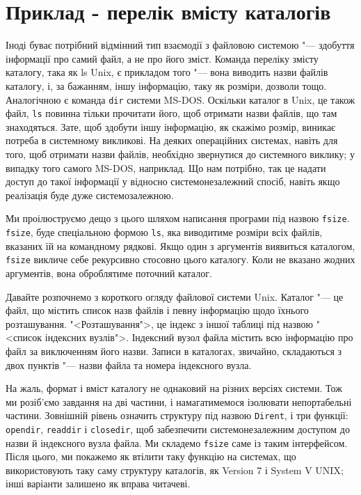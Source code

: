 \documentclass[a4paper,12pt]{book}
\begin{document}
\section{Приклад - перелік вмісту каталогів}

\label{f0:ch8.6}
  Іноді буває потрібний відмінний тип взаємодії з файловою системою "--- здобуття
  інформації про самий файл, а не про його зміст. Команда переліку змісту каталогу, така
  як ls Unix, є прикладом того "--- вона виводить назви файлів каталогу, і, за
  бажанням, іншу інформацію, таку як розміри, дозволи тощо. Аналогічною є команда
  \texttt{dir} системи MS-DOS. Оскільки каталог в Unix, це також файл, \texttt{ls}
  повинна тільки прочитати його, щоб отримати назви файлів, що там знаходяться. Зате, щоб
  здобути іншу інформацію, як скажімо розмір, виникає потреба в системному викликові. На
  деяких операційних системах, навіть для того, щоб отримати назви файлів, необхідно
  звернутися до системного виклику; у випадку того самого MS-DOS, наприклад. Що нам
  потрібно, так це надати доступ до такої інформації у відносно системонезалежний спосіб,
  навіть якщо реалізація буде дуже системозалежною.

  Ми проілюструємо дещо з цього шляхом написання програми під назвою \texttt{fsize}.
  \texttt{fsize}, буде спеціальною формою \texttt{ls}, яка виводитиме розміри всіх файлів,
  вказаних їй на командному рядкові. Якщо один з аргументів виявиться каталогом,
  \texttt{fsize} викличе себе рекурсивно стосовно цього каталогу. Коли не вказано жодних
  аргументів, вона оброблятиме поточний каталог.

  Давайте розпочнемо з короткого огляду файлової системи Unix. Каталог "--- це файл,
  що містить список назв файлів і певну інформацію щодо їхнього розташування.
  "<Розташування">, це індекс з іншої таблиці під назвою "<список індексних
  вузлів">. Індексний вузол файла містить всю інформацію про файл за виключенням його
  назви. Записи в каталогах, звичайно, складаються з двох пунктів "--- назви файла та
  номера індексного вузла.

  На жаль, формат і вміст каталогу не однаковий на різних версіях системи. Тож ми
  розіб'ємо завдання на дві частини, і намагатимемося ізолювати непортабельні частини.
  Зовнішній рівень означить структуру під назвою \texttt{Dirent}, і три функції:
  \texttt{opendir}, \texttt{readdir} і \texttt{closedir}, щоб забезпечити
  системонезалежним доступом до назви й індексного вузла файла. Ми складемо \texttt{fsize}
  саме із таким інтерфейсом. Після цього, ми покажемо як втілити таку функцію на системах,
  що використовують таку саму структуру каталогів, як Version 7 і System V UNIX; інші
  варіанти залишено як вправа читачеві.
\end{document}

